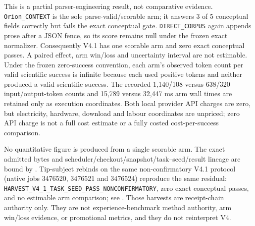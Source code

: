 This is a partial parser-engineering result, not comparative evidence.
\texttt{Orion\_CONTEXT} is the sole parse-valid/scorable arm; it answers 3 of 5
conceptual fields correctly but fails the exact conceptual gate.
\texttt{DIRECT\_CORPUS} again appends prose after a JSON fence, so its score
remains null under the frozen exact normalizer.  Consequently V4.1 has one
scorable arm and zero exact conceptual passes.  A paired effect, arm win/loss
and uncertainty interval are not estimable.  Under the frozen zero-success
convention, each arm's observed token count per valid scientific success is
infinite because each used positive tokens and neither produced a valid
scientific success.  The recorded
1,140/108 versus 638/320 input/output-token counts and 15,789 versus 32,447 ms
arm wall times are retained only as execution coordinates.  Both local provider
API charges are zero, but electricity, hardware, download and labour coordinates
are unpriced; zero API charge is not a full cost estimate or a fully costed
cost-per-success comparison.

No quantitative figure is produced from a single scorable arm.  The exact
admitted bytes and scheduler/checkout/snapshot/task--seed/result lineage are
bound by
.
Tip-subject rebinds on the same non-confirmatory V4.1 protocol
(native jobs 3476520, 3476521 and 3476524) reproduce the same residual:
\texttt{HARVEST\_V4\_1\_TASK\_SEED\_PASS\_NONCONFIRMATORY}, zero exact
conceptual passes, and no estimable arm comparison; see
.
Those harvests are receipt-chain authority only.  They are not
experience-benchmark method authority, arm win/loss evidence, or
promotional metrics, and they do not reinterpret V4.

